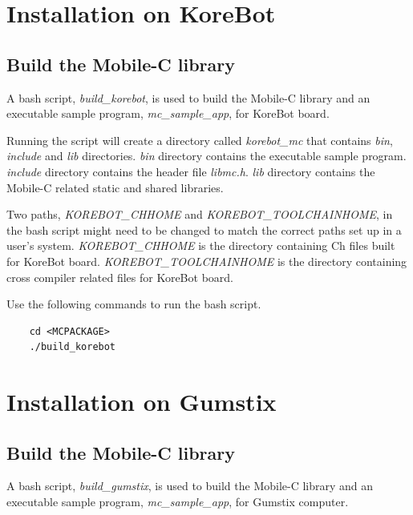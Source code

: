 \documentclass[11pt]{report}
\begin{document}
\section{Installation on KoreBot}

\subsection{Build the Mobile-C library}
A bash script, \textit{build\_korebot}, is used to build the Mobile-C library 
and an executable sample program, \textit{mc\_sample\_app}, for KoreBot board.

Running the script will create a directory called \textit{korebot\_mc} that 
contains \textit{bin}, \textit{include} and \textit{lib} directories.
\textit{bin} directory contains the executable sample program.    
\textit{include} directory contains the header file \textit{libmc.h}.
\textit{lib} directory contains the Mobile-C related static and shared 
libraries.

Two paths, \textit{KOREBOT\_CHHOME} and \textit{KOREBOT\_TOOLCHAINHOME}, 
in the bash script might need to be changed to match the correct 
paths set up in a user's system.
\textit{KOREBOT\_CHHOME} is the directory containing Ch files built for 
KoreBot board.
\textit{KOREBOT\_TOOLCHAINHOME} is the directory containing cross compiler 
related files for KoreBot board. 

Use the following commands to run the bash script.

\begin{verbatim}
    cd <MCPACKAGE>
    ./build_korebot
\end{verbatim}

\section{Installation on Gumstix}

\subsection{Build the Mobile-C library}
A bash script, \textit{build\_gumstix}, is used to build the Mobile-C library 
and an executable sample program, \textit{mc\_sample\_app}, for Gumstix 
computer.
\end{document}
